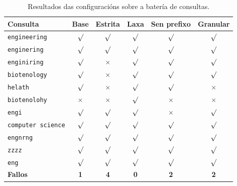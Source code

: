 \documentclass[%
    a4paper,               %
    twoside,               %
    10pt,                  %
]{article}                 %
\begin{document}
\begin{table}[b]
    \centering
    \begin{tabular}{lccccc}
        \hline
        \textbf{Consulta}         & \textbf{Base} & \textbf{Estrita} & \textbf{Laxa} & \textbf{Sen prefixo} & \textbf{Granular} \\
        \hline
        \texttt{engineering}      & $\surd$       & $\surd$          & $\surd$       & $\surd$              & $\surd$           \\
        \texttt{enginering}       & $\surd$       & $\surd$          & $\surd$       & $\surd$              & $\surd$           \\
        \texttt{enginiring}       & $\surd$       & $\times$         & $\surd$       & $\surd$              & $\surd$           \\
        \texttt{biotenology}      & $\surd$       & $\times$         & $\surd$       & $\surd$              & $\surd$           \\
        \texttt{helath}           & $\surd$       & $\times$         & $\surd$       & $\surd$              & $\times$          \\
        \texttt{biotenolohy}      & $\times$      & $\times$         & $\surd$       & $\times$             & $\times$          \\
        \texttt{engi}             & $\surd$       & $\surd$          & $\surd$       & $\times$             & $\surd$           \\
        \texttt{computer science} & $\surd$       & $\surd$          & $\surd$       & $\surd$              & $\surd$           \\
        \texttt{engnrng}          & $\surd$       & $\surd$          & $\surd$       & $\surd$              & $\surd$           \\
        \texttt{zzzz}             & $\surd$       & $\surd$          & $\surd$       & $\surd$              & $\surd$           \\
        \texttt{eng}              & $\surd$       & $\surd$          & $\surd$       & $\surd$              & $\surd$           \\
        \hline
        \textbf{Fallos}           & \textbf{1}    & \textbf{4}       & \textbf{0}    & \textbf{2}           & \textbf{2}        \\
        \hline
    \end{tabular}
    \caption{Resultados das configuracións sobre a batería de consultas.}
    \label{tab:calibrado}
\end{table}
\end{document}
